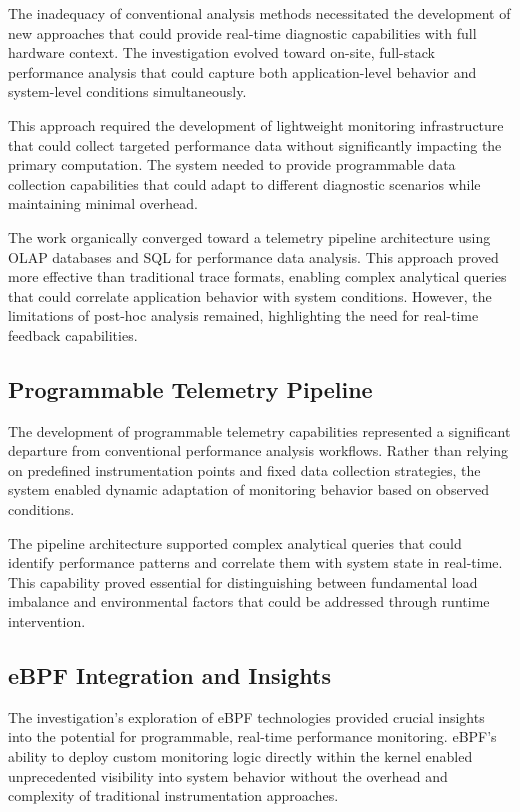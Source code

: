 The inadequacy of conventional analysis methods necessitated the development of new approaches
that could provide real-time diagnostic capabilities with full hardware context.
The investigation evolved toward on-site, full-stack performance analysis that could capture
both application-level behavior and system-level conditions simultaneously.

This approach required the development of lightweight monitoring infrastructure that could collect
targeted performance data without significantly impacting the primary computation.
The system needed to provide programmable data collection capabilities that could adapt to
different diagnostic scenarios while maintaining minimal overhead.

The work organically converged toward a telemetry pipeline architecture using OLAP databases and
SQL for performance data analysis.
This approach proved more effective than traditional trace formats, enabling complex analytical
queries that could correlate application behavior with system conditions.
However, the limitations of post-hoc analysis remained, highlighting the need for real-time
feedback capabilities.

\subsection{Programmable Telemetry Pipeline}

The development of programmable telemetry capabilities represented a significant departure from
conventional performance analysis workflows.
Rather than relying on predefined instrumentation points and fixed data collection strategies,
the system enabled dynamic adaptation of monitoring behavior based on observed conditions.

The pipeline architecture supported complex analytical queries that could identify performance
patterns and correlate them with system state in real-time.
This capability proved essential for distinguishing between fundamental load imbalance and
environmental factors that could be addressed through runtime intervention.

\subsection{eBPF Integration and Insights}

The investigation's exploration of eBPF technologies provided crucial insights into the potential
for programmable, real-time performance monitoring.
eBPF's ability to deploy custom monitoring logic directly within the kernel enabled unprecedented
visibility into system behavior without the overhead and complexity of traditional instrumentation
approaches.

